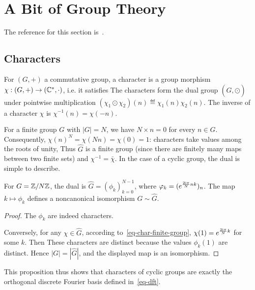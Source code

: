 \section{A Bit of Group Theory}

The reference for this section is~\cite{peyre2004algebre}.

\subsection{Characters}

For $(G,+)$ a commutative group, a character is a group morphism $\chi : (G,+) \rightarrow (\mathbb{C}^*,\cdot)$, i.e. it satisfies
The characters form the dual group $(\hat G,\odot)$ under pointwise multiplication $(\chi_1 \odot \chi_2)(n) \eqdef \chi_1(n) \chi_2(n)$. The inverse of a character $\chi$ is $\chi^{-1}(n)=\chi(-n)$.

For a finite group $G$ with $|G|=N$, we have $N \times n=0$ for every $n \in G$. Consequently, $\chi(n)^N=\chi(N n)=\chi(0)=1$: characters take values among the roots of unity,
Thus $\hat G$ is a finite group (since there are finitely many maps between two finite sets) and $\chi^{-1}=\bar\chi$. In the case of a cyclic group, the dual is simple to describe.

\begin{prop}\label{prop-iso-cyclic}
	For $G=\mathbb{Z}/N\mathbb{Z}$, the dual is $\hat G=( \phi_k )_{k=0}^{N-1}$, where $\varphi_k=( e^{\frac{2\mathrm{i}\pi}{N} nk} )_n$. The map $k \mapsto \phi_k$ defines a noncanonical isomorphism $G \sim \hat G$.
\end{prop}
\begin{proof}
	The $\phi_k$ are indeed characters.
	
	Conversely, for any $\chi \in \hat G$, according to~\eqref{eq-char-finite-group}, $\chi(1)=e^{\frac{2\mathrm{i}\pi}{N} k}$ for some $k$. Then 
	These characters are distinct because the values $\phi_k(1)$ are distinct. Hence $|G|=|\hat G|$, and the displayed map is an isomorphism.
\end{proof}

This proposition thus shows that characters of cyclic groups are exactly the orthogonal discrete Fourier basis defined in~\eqref{eq-dft}.


